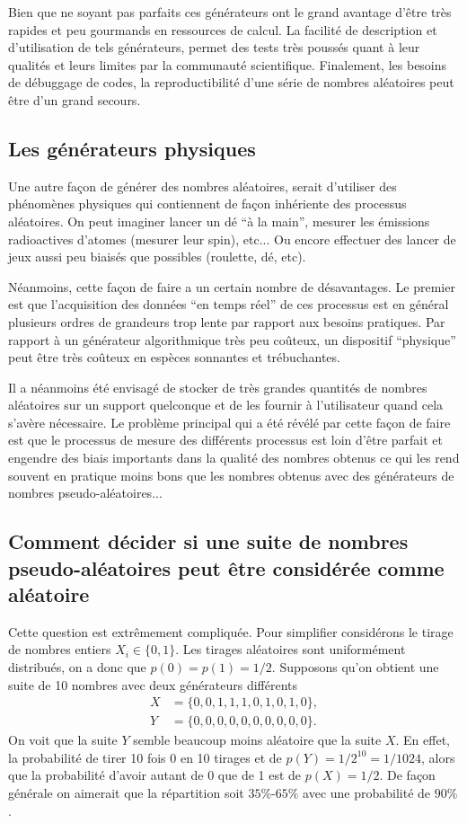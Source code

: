 \documentclass[a4paper,12pt]{book}
\begin{document}
Bien que ne soyant pas parfaits ces générateurs ont le grand avantage d'être très rapides et peu
gourmands en ressources de calcul. La facilité de description et d'utilisation
de tels  générateurs, permet des tests très poussés quant à leur qualités et leurs limites
par la communauté scientifique. Finalement, les besoins de débuggage de codes,
la reproductibilité d'une série de nombres aléatoires
peut être d'un grand secours. 

\subsection{Les générateurs physiques}

Une autre façon de générer des nombres aléatoires, serait d'utiliser des phénomènes physiques
qui contiennent de façon inhériente des processus aléatoires. On peut imaginer 
lancer un dé ``à la main'', mesurer les émissions radioactives d'atomes (mesurer leur spin), 
etc... Ou encore effectuer des lancer de jeux aussi peu biaisés que possibles (roulette, dé, etc).

Néanmoins, cette façon de faire a un certain nombre de désavantages. Le premier
est que l'acquisition des données ``en temps réel'' de ces processus est en général plusieurs
ordres de grandeurs trop lente par rapport aux besoins pratiques. Par rapport à un générateur algorithmique
très peu coûteux, un dispositif ``physique'' peut être très coûteux en espèces sonnantes et trébuchantes.

Il a néanmoins été envisagé de stocker de très grandes quantités de nombres aléatoires
sur un support quelconque et de les fournir à l'utilisateur quand cela s'avère nécessaire.
Le problème principal qui a été révélé par cette façon de faire est que le processus de mesure
des différents processus est loin d'être parfait et engendre des biais importants 
dans la qualité des nombres obtenus ce qui les rend souvent en pratique moins bons que 
les nombres obtenus avec des générateurs de nombres pseudo-aléatoires...

\subsection{Comment décider si une suite de nombres pseudo-aléatoires peut 
être considérée comme aléatoire}

Cette question est extrêmement compliquée. Pour simplifier considérons le tirage de nombres 
entiers $X_i\in \{0,1\}$. Les tirages aléatoires sont uniformément distribués,
on a donc que $p(0)=p(1)=1/2$. Supposons qu'on obtient une suite de 10 nombres 
avec deux générateurs différents
\begin{align}
 X&=\{0,0,1,1,1,0,1,0,1,0\},\\
 Y&=\{0,0,0,0,0,0,0,0,0,0\}.
\end{align}
On voit que la suite $Y$ semble beaucoup moins aléatoire que la suite $X$. 
En effet, la probabilité de tirer 10 fois 0 en 10 tirages et de $p(Y)=1/2^{10}=1/1024$,
alors que la probabilité d'avoir autant de 0 que de 1 est de $p(X)=1/2$.
De façon générale on aimerait que la répartition soit $35\%$-$65\%$ avec une probabilité
de $90\%$.
\end{document}
